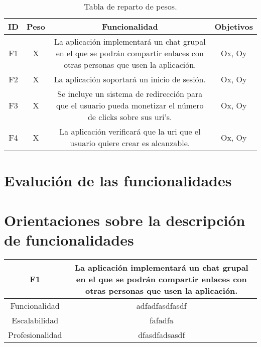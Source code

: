\documentclass{article}
\begin{document}

\begin{table}[hbtp]
    \footnotesize
    \centering
    \settowidth{}
    \setlength\extrarowheight{5pt}
    \begin{tabulary}{\textwidth}{ C C C C}
        \textbf{ID} & 
        \textbf{Peso} & 
        \textbf{Funcionalidad} & 
        \textbf{Objetivos}\\
    \hline
    \hline
        F1 & 
        X & 
        La aplicación implementará un chat grupal en el que se podrán compartir enlaces con otras personas que usen la aplicación. &
        Ox, Oy\\
    \hline  
        F2 &
        X &
        La aplicación soportará un inicio de sesión. &
        Ox, Oy\\
    \hline
        F3 &
        X &
        Se incluye un sistema de redirección para que el usuario pueda monetizar el número de clicks sobre sus uri's. &
        Ox, Oy\\
    \hline
        F4 &
        X &
        La aplicación verificará que la uri que el usuario quiere crear es alcanzable. &
        Ox, Oy

    \end{tabulary}
    \caption{Tabla de reparto de pesos.}
\end{table}

\section*{Evalución de las funcionalidades}
\section*{Orientaciones sobre la descripción de funcionalidades}


\pagebreak

\begin{table}[hbtp]
    \footnotesize
    \centering
    \settowidth{}
    \setlength\extrarowheight{5pt}
    \begin{tabulary}{\textwidth}{ C C }
        \textbf{F1} & La aplicación implementará un chat grupal en el que se podrán compartir enlaces con otras personas que usen la aplicación.
        \\
    \hline
    
    Funcionalidad & adfadfasdfasdf\\
        
    Escalabilidad & fafadfa \\

    Profesionalidad & dfasdfadsasdf \\

    \end{tabulary}
\end{table}
\end{document}

